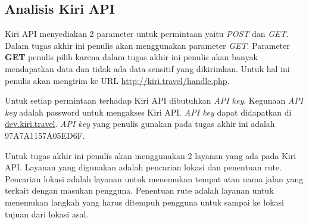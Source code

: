 \subsection{Analisis Kiri API}
\label{lab:Analisis Kiri API}
\hspace{0.5cm} Kiri API menyediakan 2 parameter untuk permintaan yaitu \textit{POST} dan \textit{GET}. Dalam tugas akhir ini penulis akan menggunakan parameter \textit{GET}. Parameter \textbf{GET} penulis pilih karena dalam tugas akhir ini penulis akan banyak mendapatkan data dan tidak ada data sensitif yang dikirimkan. Untuk hal ini penulis akan mengirim ke URL \url{http://kiri.travel/handle.php}.

Untuk setiap permintaan terhadap Kiri API dibutuhkan \textit{API key}. Kegunaan \textit{API key} adalah password untuk mengakses Kiri API. \textit{API key} dapat didapatkan di \url{dev.kiri.travel}. \textit{API key} yang penulis gunakan pada tugas akhir ini adalah 97A7A1157A05ED6F.
     
Untuk tugas akhir ini penulis akan menggunakan 2 layanan yang ada pada Kiri API. Layanan yang digunakan adalah pencarian lokasi dan penentuan rute. Pencarian lokasi adalah layanan untuk menemukan tempat atau nama jalan yang terkait dengan masukan pengguna. Penentuan rute adalah layanan untuk menemukan langkah yang harus ditempuh pengguna untuk sampai ke lokasi tujuan dari lokasi asal. 

